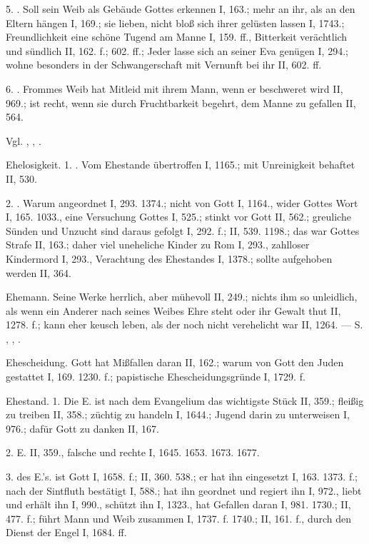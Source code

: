5. . Soll sein Weib als Gebäude Gottes erkennen I, 163.; mehr an ihr, als an den Eltern hängen I, 169.; sie lieben, nicht bloß sich ihrer gelüsten lassen I, 1743.; Freundlichkeit eine schöne Tugend am Manne I, 159. ff., Bitterkeit verächtlich und sündlich II, 162. f.; 602. ff.; Jeder lasse sich an seiner Eva genügen I, 294.; wohne besonders in der Schwangerschaft mit Vernunft bei ihr II, 602. ff.

6. . Frommes Weib hat Mitleid mit ihrem Mann, wenn er beschweret wird II, 969.; ist recht, wenn sie durch Fruchtbarkeit begehrt, dem Manne zu gefallen II, 564.

Vgl. , , .

Ehelosigkeit. 1. . Vom Ehestande übertroffen I, 1165.; mit Unreinigkeit behaftet II, 530.

2. . Warum angeordnet I, 293. 1374.; nicht von Gott I, 1164., wider Gottes Wort I, 165. 1033., eine Versuchung Gottes I, 525.; stinkt vor Gott II, 562.; greuliche Sünden und Unzucht sind daraus gefolgt I, 292. f.; II, 539. 1198.; das war Gottes Strafe II, 163.; daher viel uneheliche Kinder zu Rom I, 293., zahlloser Kindermord I, 293., Verachtung des Ehestandes I, 1378.; sollte aufgehoben werden II, 364.

Ehemann. Seine Werke herrlich, aber mühevoll II, 249.; nichts ihm so unleidlich, als wenn ein Anderer nach seines Weibes Ehre steht oder ihr Gewalt thut II, 1278. f.; kann eher keusch leben, als der noch nicht verehelicht war II, 1264. — S. , , .

Ehescheidung. Gott hat Mißfallen daran II, 162.; warum von Gott den Juden gestattet I, 169. 1230. f.; papistische Ehescheidungsgründe I, 1729. f.

Ehestand. 1. Die  E. ist nach dem Evangelium das wichtigste Stück II, 359.; fleißig zu treiben II, 358.; züchtig zu handeln I, 1644.; Jugend darin zu unterweisen I, 976.; dafür Gott zu danken II, 167.

2.  E.  II, 359., falsche und rechte  I, 1645. 1653. 1673. 1677.

3.  des E.’s. ist Gott I, 1658. f.; II, 360. 538.; er hat ihn eingesetzt I, 163. 1373. f.; nach der Sintfluth bestätigt I, 588.; hat ihn geordnet und regiert ihn I, 972., liebt und erhält ihn I, 990., schützt ihn I, 1323., hat Gefallen daran I, 981. 1730.; II, 477. f.; führt Mann und Weib zusammen I, 1737. f. 1740.; II, 161. f., durch den Dienst der Engel I, 1684. ff.

